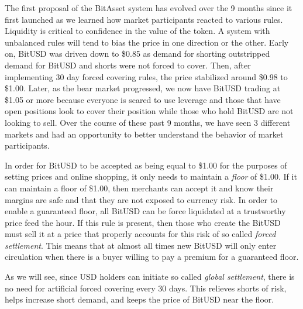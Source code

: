 The first proposal of the BitAsset system has evolved over the 9 months since
it first launched as we learned how market participants reacted to various
rules. Liquidity is critical to confidence in the value of the token. A system
with unbalanced rules will tend to bias the price in one direction or the
other. Early on, BitUSD was driven down to \$0.85 as demand for shorting
outstripped demand for BitUSD and shorts were not forced to cover. Then, after
implementing 30 day forced covering rules, the price stabilized around \$0.98 to
\$1.00. Later, as the bear market progressed, we now have BitUSD trading at
\$1.05 or more because everyone is scared to use leverage and those that have
open positions look to cover their position while those who hold BitUSD are not
looking to sell. Over the course of these past 9 months, we have seen 3
different markets and had an opportunity to better understand the behavior of
market participants.

In order for BitUSD to be accepted as being equal to \$1.00 for the purposes of
setting prices and online shopping, it only needs to maintain a \emph{floor} of
\$1.00. If it can maintain a floor of \$1.00, then merchants can accept it and
know their margins are safe and that they are not exposed to currency risk. In
order to enable a guaranteed floor, all BitUSD can be force liquidated at a
trustworthy price feed the hour. If this rule is present, then those who create
the BitUSD must sell it at a price that properly accounts for this risk of so
called \emph{forced settlement}. This means that at almost all times new BitUSD
will only enter circulation when there is a buyer willing to pay a premium for
a guaranteed floor.

As we will see, since USD holders can initiate so called \emph{global
settlement}, there is no need for artificial forced covering every 30 days.
This relieves shorts of risk, helps increase short demand, and keeps the price
of BitUSD near the floor.
